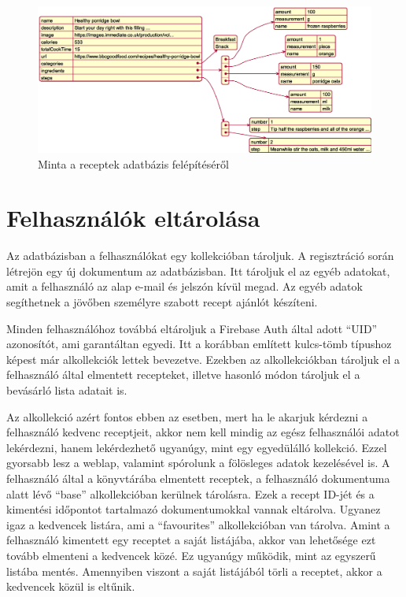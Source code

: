\documentclass[12pt]{report}
\theoremstyle{definition}
\begin{document}
\noindent
\begin{figure}[H]
	\centering
	\includegraphics[width=\textwidth]{out/diagrams/jsonRecipes/jsonRecipes.eps}
	\caption{Minta a receptek adatbázis felépítéséről}
    \label{fig:jsonRecipes}
\end{figure}

\section{Felhasználók eltárolása}
Az adatbázisban a felhasználókat egy kollekcióban tároljuk. A regisztráció során létrejön egy új dokumentum az adatbázisban. Itt tároljuk el az egyéb adatokat, amit a felhasználó az alap e-mail és jelszón kívül megad. Az egyéb adatok segíthetnek a jövőben személyre szabott recept ajánlót készíteni. 

Minden felhasználóhoz továbbá eltároljuk a Firebase Auth által adott “UID” azonosítót, ami garantáltan egyedi. Itt a korábban említett kulcs-tömb típushoz képest már alkollekciók lettek bevezetve. Ezekben az alkollekciókban tároljuk el a felhasználó által elmentett recepteket, illetve hasonló módon tároljuk el a bevásárló lista adatait is.

Az alkollekció azért fontos ebben az esetben, mert ha le akarjuk kérdezni a felhasználó kedvenc receptjeit, akkor nem kell mindig az egész felhasználói adatot lekérdezni, hanem lekérdezhető ugyanúgy, mint egy egyedülálló kollekció. Ezzel gyorsabb lesz a weblap, valamint spórolunk a fölösleges adatok kezelésével is. A felhasználó által a könyvtárába elmentett receptek, a felhasználó dokumentuma alatt lévő “base” alkollekcióban kerülnek tárolásra. Ezek a recept ID-jét és a kimentési időpontot tartalmazó dokumentumokkal vannak eltárolva. Ugyanez igaz a kedvencek listára, ami a  “favourites” alkollekcióban van tárolva. Amint a felhasználó kimentett egy receptet a saját listájába, akkor van lehetősége ezt tovább elmenteni a kedvencek közé. Ez ugyanúgy működik, mint az egyszerű listába mentés. Amennyiben viszont a saját listájából törli a receptet, akkor a kedvencek közül is eltűnik. 
\end{document}
